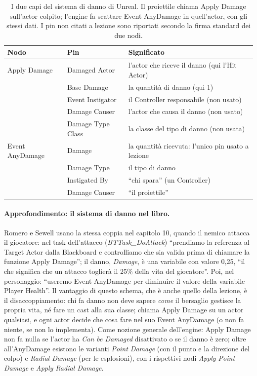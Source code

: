 \begin{table}[htbp]
\centering
\small
\begin{tabular}{@{}p{3.2cm}p{3.6cm}p{7.2cm}@{}}
\toprule
\textbf{Nodo} & \textbf{Pin} & \textbf{Significato} \\
\midrule
Apply Damage & Damaged Actor & l'actor che riceve il danno (qui l'Hit Actor) \\
 & Base Damage & la quantità di danno (qui 1) \\
 & Event Instigator & il Controller responsabile (non usato) \\
 & Damage Causer & l'actor che causa il danno (non usato) \\
 & Damage Type Class & la classe del tipo di danno (non usata) \\
\midrule
Event AnyDamage & Damage & la quantità ricevuta: l'unico pin usato a lezione \\
 & Damage Type & il tipo di danno \\
 & Instigated By & ``chi spara'' (un Controller) \\
 & Damage Causer & ``il proiettile'' \\
\bottomrule
\end{tabular}
\caption{I due capi del sistema di danno di Unreal. Il proiettile chiama Apply Damage
sull'actor colpito; l'engine fa scattare Event AnyDamage in quell'actor, con gli stessi
dati. I pin non citati a lezione sono riportati secondo la firma standard dei due nodi.}
\label{ue11:tab:danno}
\end{table}

\paragraph{Approfondimento: il sistema di danno nel libro.} Romero e Sewell usano la stessa
coppia nel capitolo 10, quando il nemico attacca il giocatore: nel task dell'attacco
(\emph{BTTask\_DoAttack}) ``prendiamo la referenza al Target Actor dalla Blackboard e
controlliamo che sia valida prima di chiamare la funzione Apply Damage''; il danno,
\emph{Damage}, è una variabile con valore 0,25, ``il che significa che un attacco toglierà
il 25\% della vita del giocatore''. Poi, nel personaggio: ``useremo Event AnyDamage per
diminuire il valore della variabile Player Health''. Il vantaggio di questo schema, che è
anche quello della lezione, è il disaccoppiamento: chi fa danno non deve sapere
\emph{come} il bersaglio gestisce la propria vita, né fare un cast alla sua classe; chiama
Apply Damage su un actor qualsiasi, e ogni actor decide che cosa fare nel suo Event
AnyDamage (o non fa niente, se non lo implementa). Come nozione generale dell'engine: Apply
Damage non fa nulla se l'actor ha \emph{Can be Damaged} disattivato o se il danno è zero;
oltre all'AnyDamage esistono le varianti \emph{Point Damage} (con il punto e la direzione
del colpo) e \emph{Radial Damage} (per le esplosioni), con i rispettivi nodi \emph{Apply
Point Damage} e \emph{Apply Radial Damage}.

